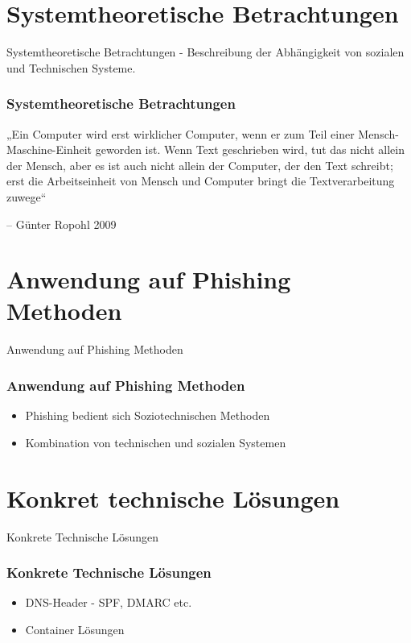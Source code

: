 \documentclass{beamer}
\begin{document}
\section{Systemtheoretische Betrachtungen}
\begin{frame}{Systemtheoretische Betrachtungen}
- Beschreibung der Abhängigkeit von sozialen und Technischen Systeme.\\
\vspace{2mm}
 \frametitle{Systemtheoretische Betrachtungen}
 „Ein Computer wird erst wirklicher Computer, wenn er zum Teil einer Mensch-Maschine-Einheit geworden ist. Wenn Text geschrieben wird, tut das nicht allein der Mensch, aber es ist auch nicht allein der Computer, der den Text schreibt; erst die Arbeitseinheit von Mensch und Computer bringt die Textverarbeitung zuwege“
 
 – Günter Ropohl 2009
\end{frame}
\section{Anwendung auf Phishing Methoden}
\begin{frame}{Anwendung auf Phishing Methoden}
 \frametitle{Anwendung auf Phishing Methoden}
 
 \begin{itemize}
  \item Phishing bedient sich Soziotechnischen Methoden
  \item Kombination von technischen und sozialen Systemen
 \end{itemize}

\end{frame}
\section{Konkret technische Lösungen}
\begin{frame}{Konkrete Technische Lösungen}
 \frametitle{Konkrete Technische Lösungen}
 \begin{itemize}
  \item DNS-Header - SPF, DMARC etc.
  \item Container Lösungen
 \end{itemize}

\end{frame}
\end{document}

